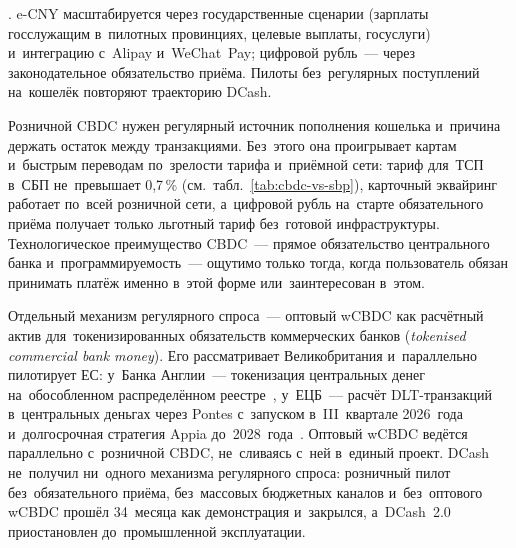 . e-CNY масштабируется через государственные сценарии (зарплаты
госслужащим в~пилотных провинциях, целевые выплаты, госуслуги) и~интеграцию с~Alipay и~WeChat~Pay; цифровой рубль~--- через
законодательное обязательство приёма. Пилоты без~регулярных поступлений
на~кошелёк повторяют траекторию DCash.

Розничной CBDC нужен регулярный источник пополнения кошелька и~причина держать
остаток между транзакциями. Без~этого она проигрывает картам и~быстрым переводам
по~зрелости тарифа и~приёмной сети: тариф для~ТСП в~СБП не~превышает 0{,}7\,\%
(см.~табл.~\ref{tab:cbdc-vs-sbp}), карточный эквайринг работает по~всей
розничной сети, а~цифровой рубль на~старте обязательного приёма получает только
льготный тариф без~готовой инфраструктуры. Технологическое преимущество CBDC~---
прямое обязательство центрального банка и~программируемость~--- ощутимо только
тогда, когда пользователь обязан принимать платёж именно в~этой форме
или~заинтересован в~этом.

Отдельный механизм регулярного спроса~--- оптовый wCBDC как расчётный актив
для~токенизированных обязательств коммерческих банков (\textit{tokenised
commercial bank money}). Его рассматривает Великобритания и~параллельно
пилотирует ЕС: у~Банка Англии~--- токенизация центральных денег на~обособленном
распределённом реестре~\cite{boe-digital-pound-design-2025}, у~ЕЦБ~--- расчёт
DLT-транзакций в~центральных деньгах через Pontes с~запуском в~III~квартале
2026~года и~долгосрочная стратегия Appia до~2028~года~\cite{ecb-pontes-appia-2025}.
Оптовый wCBDC ведётся параллельно с~розничной CBDC, не~сливаясь с~ней в~единый
проект. DCash не~получил ни~одного механизма регулярного спроса:
розничный пилот без~обязательного приёма, без~массовых бюджетных каналов
и~без~оптового wCBDC прошёл 34~месяца как демонстрация и~закрылся, а~DCash~2.0
приостановлен до~промышленной эксплуатации.
